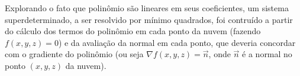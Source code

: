 Explorando o fato que polinômio são lineares em seus coeficientes, um sistema
superdeterminado, a ser resolvido por mínimo quadrados, foi contruído a partir
do cálculo dos termos do polinômio em cada ponto da nuvem (fazendo $f(x,y,z)=0$)
e da avaliação da normal em cada ponto, que deveria concordar com o gradiente do
polinômio (ou seja $\nabla f(x,y,z) = \overrightarrow{n}$, onde $\overrightarrow{n}$ é a normal no ponto $(x,y,z)$ da nuvem).



% 
